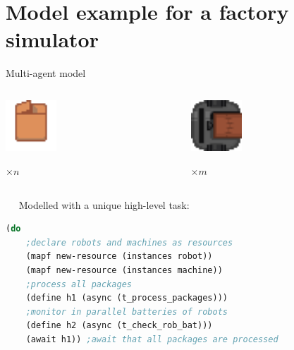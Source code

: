 \section{Model example for a factory simulator}

\begin{frame}[fragile]{Multi-agent model}
    \begin{columns}
        \begin{column}{0.5\textwidth}
            \centering
            \includegraphics[width = 0.3\textwidth]{images/godot/package.png}
            
            \Large $\times n$
        \end{column}
        \begin{column}{0.5\textwidth}
            \centering
            \includegraphics[width = 0.3\textwidth]{images/godot/robot_texture.png}
            
            \LARGE $\times m$
        \end{column}
    \end{columns}
\pause
~~
\centering
        Modelled with a unique high-level task:
        \setlength{\leftmargini}{0pt}
        \lstset{columns=fullflexible}
        \small
    \begin{lstlisting}[language = lisp]
(do
    ;declare robots and machines as resources
    (mapf new-resource (instances robot))
    (mapf new-resource (instances machine))
    ;process all packages
    (define h1 (async (t_process_packages)))
    ;monitor in parallel batteries of robots
    (define h2 (async (t_check_rob_bat)))
    (await h1)) ;await that all packages are processed
    \end{lstlisting}    
\end{frame}

